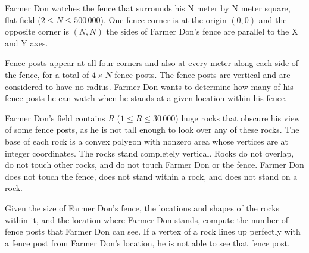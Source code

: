 Farmer Don watches the fence that surrounds his N meter by N meter square, flat field ($2 \leq N \leq 500\,000$). One fence corner is at the origin $(0, 0)$ and the opposite corner is  $(N, N)$ the sides of Farmer Don's fence are parallel to the X and Y axes.

Fence posts appear at all four corners and also at every meter along each side of the fence, for a total of $4\times N$ fence posts. The fence posts are vertical and are considered  to have no radius. Farmer Don wants to determine how many of his fence posts he can watch when he stands at a given location within his fence.

Farmer Don's field contains $R$ ($1 \leq R \leq 30\,000$) huge rocks that obscure his view of some fence posts, as he is not tall enough to look over any of these rocks. The base of  each rock is a convex polygon with nonzero area whose vertices are at integer coordinates. The rocks stand completely vertical. Rocks do not overlap, do not touch other rocks, and do not touch Farmer Don or the fence. Farmer Don does not touch the fence, does not stand within a rock, and does not stand on a rock.

Given the size of Farmer Don's fence, the locations and shapes of the rocks within it, and the location where Farmer Don stands, compute the number of fence posts that  Farmer Don can see. If a vertex of a rock lines up perfectly with a fence post from Farmer Don's location, he is not able to see that fence post. 